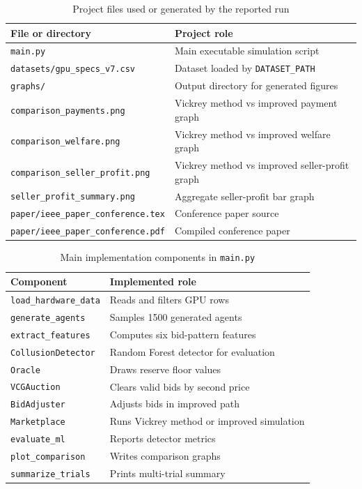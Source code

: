 \documentclass[conference]{IEEEtran}
\begin{document}
\begin{table}[htbp]
\caption{Project files used or generated by the reported run}
\label{tab:filemap}
\centering
\begin{tabular}{ll}
\toprule
\textbf{File or directory} & \textbf{Project role} \\
\midrule
\texttt{main.py} & Main executable simulation script \\
\texttt{datasets/gpu\_specs\_v7.csv} & Dataset loaded by \texttt{DATASET\_PATH} \\
\texttt{graphs/} & Output directory for generated figures \\
\texttt{comparison\_payments.png} & Vickrey method vs improved payment graph \\
\texttt{comparison\_welfare.png} & Vickrey method vs improved welfare graph \\
\texttt{comparison\_seller\_profit.png} & Vickrey method vs improved seller-profit graph \\
\texttt{seller\_profit\_summary.png} & Aggregate seller-profit bar graph \\
\texttt{paper/ieee\_paper\_conference.tex} & Conference paper source \\
\texttt{paper/ieee\_paper\_conference.pdf} & Compiled conference paper \\
\bottomrule
\end{tabular}
\end{table}

\begin{table}[htbp]
\caption{Main implementation components in \texttt{main.py}}
\label{tab:codemap}
\centering
\begin{tabular}{ll}
\toprule
\textbf{Component} & \textbf{Implemented role} \\
\midrule
\texttt{load\_hardware\_data} & Reads and filters GPU rows \\
\texttt{generate\_agents} & Samples 1500 generated agents \\
\texttt{extract\_features} & Computes six bid-pattern features \\
\texttt{CollusionDetector} & Random Forest detector for evaluation \\
\texttt{Oracle} & Draws reserve floor values \\
\texttt{VCGAuction} & Clears valid bids by second price \\
\texttt{BidAdjuster} & Adjusts bids in improved path \\
\texttt{Marketplace} & Runs Vickrey method or improved simulation \\
\texttt{evaluate\_ml} & Reports detector metrics \\
\texttt{plot\_comparison} & Writes comparison graphs \\
\texttt{summarize\_trials} & Prints multi-trial summary \\
\bottomrule
\end{tabular}
\end{table}
\end{document}
